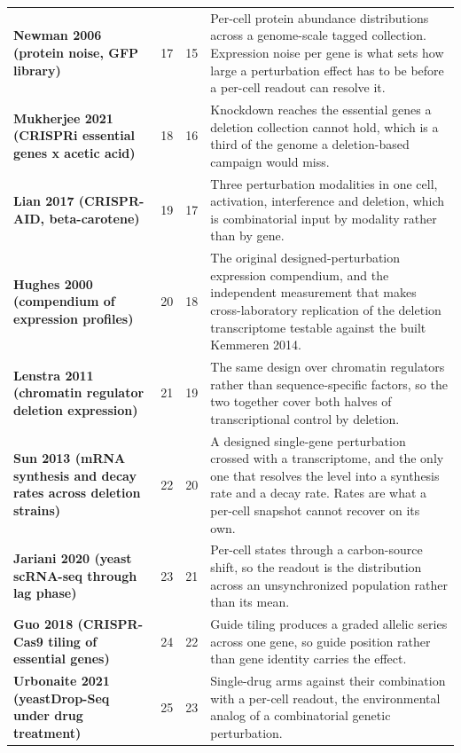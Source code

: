 \begin{longtable}{@{}L{46mm} r@{\hspace{6pt}} r@{\hspace{6pt}} L{104mm}@{}}
\addlinespace[5pt]
\textbf{Newman 2006 (protein noise, GFP library)} & 17 & 15 & Per-cell protein abundance distributions across a genome-scale tagged collection. Expression noise per gene is what sets how large a perturbation effect has to be before a per-cell readout can resolve it. \\
\addlinespace[5pt]
\textbf{Mukherjee 2021 (CRISPRi essential genes x acetic acid)} & 18 & 16 & Knockdown reaches the essential genes a deletion collection cannot hold, which is a third of the genome a deletion-based campaign would miss. \\
\addlinespace[5pt]
\textbf{Lian 2017 (CRISPR-AID, beta-carotene)} & 19 & 17 & Three perturbation modalities in one cell, activation, interference and deletion, which is combinatorial input by modality rather than by gene. \\
\addlinespace[5pt]
\textbf{Hughes 2000 (compendium of expression profiles)} & 20 & 18 & The original designed-perturbation expression compendium, and the independent measurement that makes cross-laboratory replication of the deletion transcriptome testable against the built Kemmeren 2014. \\
\addlinespace[5pt]
\textbf{Lenstra 2011 (chromatin regulator deletion expression)} & 21 & 19 & The same design over chromatin regulators rather than sequence-specific factors, so the two together cover both halves of transcriptional control by deletion. \\
\addlinespace[5pt]
\textbf{Sun 2013 (mRNA synthesis and decay rates across deletion strains)} & 22 & 20 & A designed single-gene perturbation crossed with a transcriptome, and the only one that resolves the level into a synthesis rate and a decay rate. Rates are what a per-cell snapshot cannot recover on its own. \\
\addlinespace[5pt]
\textbf{Jariani 2020 (yeast scRNA-seq through lag phase)} & 23 & 21 & Per-cell states through a carbon-source shift, so the readout is the distribution across an unsynchronized population rather than its mean. \\
\addlinespace[5pt]
\textbf{Guo 2018 (CRISPR-Cas9 tiling of essential genes)} & 24 & 22 & Guide tiling produces a graded allelic series across one gene, so guide position rather than gene identity carries the effect. \\
\addlinespace[5pt]
\textbf{Urbonaite 2021 (yeastDrop-Seq under drug treatment)} & 25 & 23 & Single-drug arms against their combination with a per-cell readout, the environmental analog of a combinatorial genetic perturbation. \\

\end{longtable}

